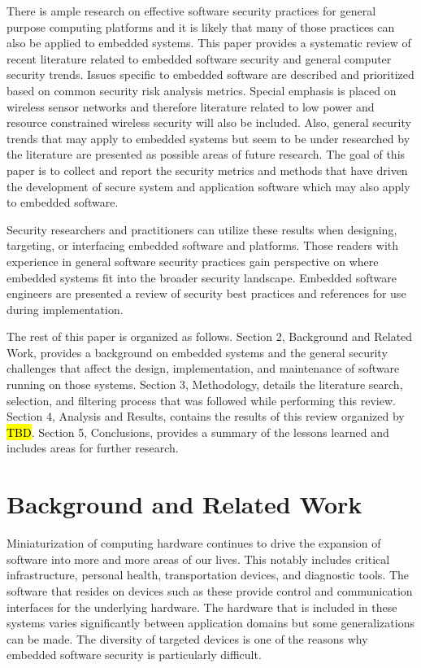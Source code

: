 \documentclass[draftcls,onecolumn,conference,12pt]{IEEEtran}
\begin{document}
There is ample research on effective software security practices for general purpose computing platforms and it is likely that many of those practices can also be applied to embedded systems. This paper provides a systematic review of recent literature related to embedded software security and general computer security trends. Issues specific to embedded software are described and prioritized based on common security risk analysis metrics.  Special emphasis is placed on wireless sensor networks and therefore literature related to low power and resource constrained wireless security will also be included.  Also, general security trends that may apply to embedded systems but seem to be under researched by the literature are presented as possible areas of future research.  The goal of this paper is to collect and report the security metrics and methods that have driven the development of secure system and application software which may also apply to embedded software.

Security researchers and practitioners can utilize these results when designing, targeting, or interfacing embedded software and platforms.  Those readers with experience in general software security practices gain perspective on where embedded systems fit into the broader security landscape.  Embedded software engineers are presented a review of security best practices and references for use during implementation.

The rest of this paper is organized as follows. Section 2, Background and Related Work, provides a background on embedded systems and the general security challenges that affect the design, implementation, and maintenance of software running on those systems. Section 3, Methodology, details the literature search, selection, and filtering process that was followed while performing this review. Section 4, Analysis and Results, contains the results of this review organized by \hl{TBD}. Section 5, Conclusions, provides a summary of the lessons learned and includes areas for further research.

\section{Background and Related Work}
Miniaturization of computing hardware continues to drive the expansion of software into more and more areas of our lives.  This notably includes critical infrastructure, personal health, transportation devices, and diagnostic tools.  The software that resides on devices such as these provide control and communication interfaces for the underlying hardware.  The hardware that is included in these systems varies significantly between application domains but some generalizations can be made.  The diversity of targeted devices is one of the reasons why embedded software security is particularly difficult.
\end{document}
